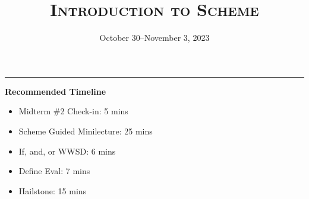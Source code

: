 \documentclass{exam}
\title{\textsc{Introduction to Scheme}}
\date{October 30--November 3, 2023}
\begin{document}
\maketitle
\rule{\textwidth}{0.15em}

\begin{meta}
\begin{blocksection}
    \textbf{Recommended Timeline}
    \begin{itemize}
        \item Midterm \#2 Check-in: 5 mins
        \item Scheme Guided Minilecture: 25 mins
        \item If, and, or WWSD: 6 mins
        \item Define Eval: 7 mins
        \item Hailstone: 15 mins
    \end{itemize}
    \vspace{10px}
\end{blocksection}
\end{meta}
\end{document}
